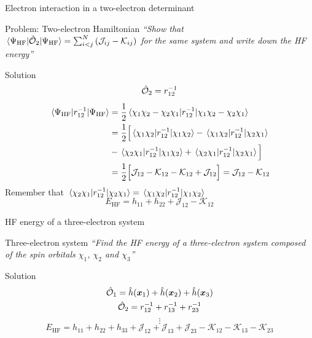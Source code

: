 \documentclass[aspectratio=169,9pt]{beamer}
\newcommand{\bx}{\boldsymbol{x}}
\newcommand{\hh}{\Hat{h}}
\newcommand{\chO}{\Hat{\mathcal{O}}}
\newcommand{\cJ}{\mathcal{J}}
\newcommand{\cK}{\mathcal{K}}
\newcommand{\violet}[1]{\textcolor{hfViolet}{#1}}
\begin{document}
\begin{frame}{Electron interaction in a two-electron determinant}
	\begin{block}{Problem: Two-electron Hamiltonian}
		\textit{\violet{``Show that $ \mel{\Psi_\text{HF}}{\chO_2}{\Psi_\text{HF}}  =  \sum_{i<j}^N \qty( \cJ_{ij} - \cK_{ij} )$ for the same system and write down the HF energy''}}
	\end{block}
	\pause
	\begin{block}{Solution}
		\small
		\begin{equation*}
			\chO_2 =r_{12}^{-1}
		\end{equation*}
		\begin{equation*}
		\begin{split}
			\mel{ \Psi_\text{HF} }{ r_{12}^{-1} }{ \Psi_\text{HF} } 
			&  = \frac{1}{2} \mel{ \chi_1 \chi_2 -  \chi_2 \chi_1 }{ r_{12}^{-1} }{ \chi_1 \chi_2 -  \chi_2 \chi_1 }
			\\
			&   = \frac{1}{2} \Big[ 
			\mel{ \chi_1 \chi_2 }{ r_{12}^{-1} }{ \chi_1 \chi_2 }
			- \mel{ \chi_1 \chi_2 }{ r_{12}^{-1} }{  \chi_2 \chi_1 }
			\\
			&   - \mel{  \chi_2 \chi_1 }{ r_{12}^{-1} }{ \chi_1 \chi_2  }
			+ \mel{  \chi_2 \chi_1 }{ r_{12}^{-1} }{  \chi_2 \chi_1 }
			\Big]
			\\
			&   =  \frac{1}{2} \Big[ \cJ_{12} - \cK_{12} - \cK_{12} + \cJ_{12} \Big] = \cJ_{12} - \cK_{12}
		\end{split}
		\end{equation*}
		\alert{Remember that $\mel{  \chi_2 \chi_1 }{ r_{12}^{-1} }{  \chi_2 \chi_1 } = \mel{  \chi_1 \chi_2 }{ r_{12}^{-1} }{  \chi_1 \chi_2 }$}
		\begin{equation*}
			\boxed{E_\text{HF} = h_{11} + h_{22} + \cJ_{12} - \cK_{12}}
		\end{equation*}
	\end{block}
\end{frame}

\begin{frame}{HF energy of a three-electron system}
	\begin{block}{Three-electron system}
		\textit{\violet{``Find the HF energy of a three-electron system composed of the spin orbitals $\chi_1$, $\chi_2$ and $\chi_3$''}}
	\end{block}
	\pause
	\begin{block}{Solution}
		\begin{gather*}
			\chO_1 = \hh(\bx_1) + \hh(\bx_2) + \hh(\bx_3)
			\\
			\chO_2 =r_{12}^{-1} + r_{13}^{-1} + r_{23}^{-1}
		\end{gather*}
		$$ \vdots $$
		\begin{equation*}
			\boxed{E_\text{HF} = h_{11} + h_{22} + h_{33} + \cJ_{12} + \cJ_{13} + \cJ_{23} - \cK_{12} - \cK_{13} - \cK_{23}}
		\end{equation*}
	\end{block}
\end{frame}
\end{document}
